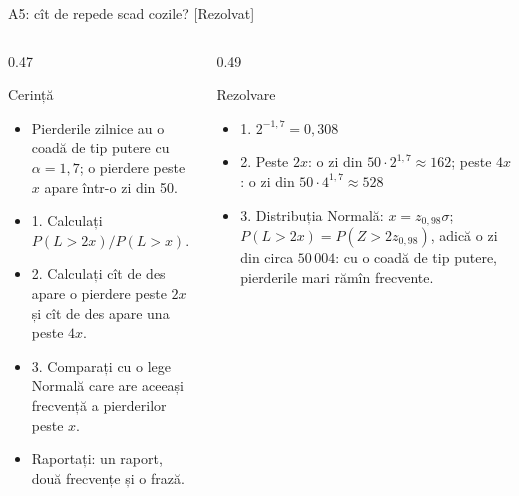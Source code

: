 \begin{frame}{A5: cît de repede scad cozile? [Rezolvat]}
\itemsize{\footnotesize}
\begin{columns}[T]
\begin{column}{0.47\textwidth}
\begin{block}{Cerință}
\begin{itemize}
    \item Pierderile zilnice au o coadă de tip putere cu $\alpha = 1{,}7$; o pierdere peste $x$ apare într-o zi din 50.
    \item 1. Calculați $P(L > 2x)/P(L > x)$.
    \item 2. Calculați cît de des apare o pierdere peste $2x$ și cît de des apare una peste $4x$.
    \item 3. Comparați cu o lege Normală care are aceeași frecvență a pierderilor peste $x$.
    \item Raportați: un raport, două frecvențe și o frază.
\end{itemize}
\end{block}
\end{column}
\begin{column}{0.49\textwidth}
\begin{exampleblock}{Rezolvare}
\begin{itemize}
    \item 1. $2^{-1{,}7} = 0{,}308$
    \item 2. Peste $2x$: o zi din $50 \cdot 2^{1{,}7} \approx 162$; peste $4x$: o zi din $50 \cdot 4^{1{,}7} \approx 528$
    \item 3. Distribuția Normală: $x = z_{0{,}98}\sigma$; $P(L > 2x) = P(Z > 2z_{0{,}98})$, adică o zi din circa $50\,004$: cu o coadă de tip putere, pierderile mari rămîn frecvente.
\end{itemize}
\end{exampleblock}
\end{column}
\end{columns}
\end{frame}

